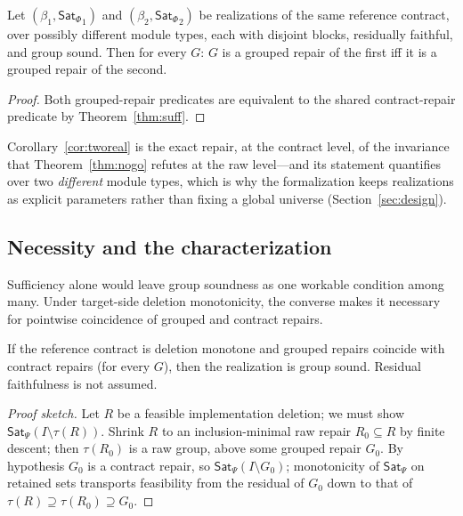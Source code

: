 \documentclass[sigplan,10pt,review,anonymous]{acmart}
\theoremstyle{acmdefinition}
\newcommand{\SatPsi}{{\mathsf{Sat}_\Psi}}
\newcommand{\SatPhi}{{\mathsf{Sat}_\Phi}}
\begin{document}
\begin{corollary}
\label{cor:tworeal}
Let $(\beta_1, \SatPhi_1)$ and $(\beta_2, \SatPhi_2)$ be realizations of the
same reference contract, over possibly different module types, each with
disjoint blocks, residually faithful, and group sound. Then for every $G$:
$G$ is a grouped repair of the first iff it is a grouped repair of the
second.
\end{corollary}

\begin{proof}
Both grouped-repair predicates are equivalent to the shared contract-repair
predicate by Theorem~\ref{thm:suff}.
\end{proof}

Corollary~\ref{cor:tworeal} is the exact repair, at the contract level, of
the invariance that Theorem~\ref{thm:nogo} refutes at the raw level---and its
statement quantifies over two \emph{different} module types, which is why the
formalization keeps realizations as explicit parameters rather than fixing a
global universe (Section~\ref{sec:design}).

\subsection{Necessity and the characterization}

Sufficiency alone would leave group soundness as one workable condition among
many. Under target-side deletion monotonicity, the converse makes it necessary
for pointwise coincidence of grouped and contract repairs.

\begin{theorem}
\label{thm:conv}
If the reference contract is deletion monotone and grouped repairs coincide
with contract repairs (for every $G$), then the realization is group sound.
Residual faithfulness is not assumed.
\end{theorem}

\begin{proof}[Proof sketch]
Let $R$ be a feasible implementation deletion; we must show
$\SatPsi(I \setminus \tau(R))$. Shrink $R$ to an inclusion-minimal raw repair
$R_0 \subseteq R$ by finite descent; then $\tau(R_0)$ is a raw group, above
some grouped repair $G_0$. By hypothesis $G_0$ is a contract repair, so
$\SatPsi(I \setminus G_0)$; monotonicity of $\SatPsi$ on retained sets
transports feasibility from the residual of $G_0$ down to that of
$\tau(R) \supseteq \tau(R_0) \supseteq G_0$.
\end{proof}
\end{document}
